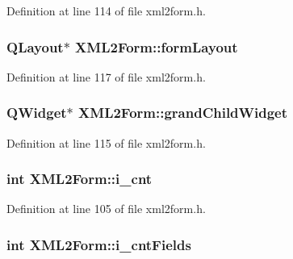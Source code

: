 Definition at line 114 of file xml2form.h.

\hypertarget{classXML2Form_a54e053fb4e1186a487f9bce37b9ef078}{
\subsubsection[{formLayout}]{\setlength{\rightskip}{0pt plus 5cm}QLayout$\ast$ {\bf XML2Form::formLayout}}}
\label{classXML2Form_a54e053fb4e1186a487f9bce37b9ef078}


Definition at line 117 of file xml2form.h.

\hypertarget{classXML2Form_ab1d32c23c4b270fd000b5e2d09272f31}{
\subsubsection[{grandChildWidget}]{\setlength{\rightskip}{0pt plus 5cm}QWidget$\ast$ {\bf XML2Form::grandChildWidget}}}
\label{classXML2Form_ab1d32c23c4b270fd000b5e2d09272f31}


Definition at line 115 of file xml2form.h.

\hypertarget{classXML2Form_a984c469e4d9c9ffc99c99897bd3122bf}{
\subsubsection[{i\_\-cnt}]{\setlength{\rightskip}{0pt plus 5cm}int {\bf XML2Form::i\_\-cnt}}}
\label{classXML2Form_a984c469e4d9c9ffc99c99897bd3122bf}


Definition at line 105 of file xml2form.h.

\hypertarget{classXML2Form_ad747ac3452cf4212ded9dfb4632d6bf8}{
\subsubsection[{i\_\-cntFields}]{\setlength{\rightskip}{0pt plus 5cm}int {\bf XML2Form::i\_\-cntFields}}}
\label{classXML2Form_ad747ac3452cf4212ded9dfb4632d6bf8}


